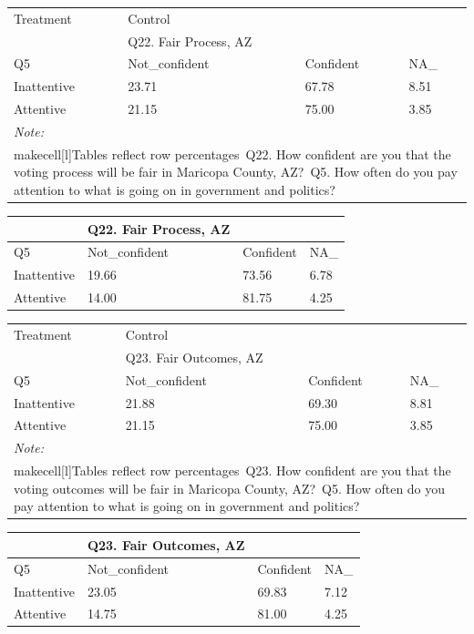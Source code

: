 \documentclass[
  11pt,
  a4paper,
]{article}
\begin{document}
\begin{table}
\centering
\centering
\begin{tabular}[t]{l|l|l|l}
\hline
\multicolumn{1}{l|}{Treatment} & \multicolumn{1}{l}{Control} \\
\cline{1-1} \cline{2-2}
 & Q22. Fair Process, AZ &  & \\
\hline
Q5 & Not\_confident & Confident & NA\_\\
\hline
Inattentive & 23.71 & 67.78 & 8.51\\
\hline
Attentive & 21.15 & 75.00 & 3.85\\
\hline
\multicolumn{4}{l}{\rule{0pt}{1em}\textit{Note: }}\\
\multicolumn{4}{l}{\rule{0pt}{1em}makecell[l]{Tables reflect row percentages\ Q22. How confident are you that the voting process will be fair in Maricopa County, AZ?\ Q5. How often do you pay attention to what is going on in government and politics?}}\\
\end{tabular}
\centering
\begin{tabular}[t]{l|l|l|l}
\hline
 & Q22. Fair Process, AZ &  & \\
\hline
Q5 & Not\_confident & Confident & NA\_\\
\hline
Inattentive & 19.66 & 73.56 & 6.78\\
\hline
Attentive & 14.00 & 81.75 & 4.25\\
\hline
\end{tabular}
\end{table}

\begin{table}
\centering
\centering
\begin{tabular}[t]{l|l|l|l}
\hline
\multicolumn{1}{l|}{Treatment} & \multicolumn{1}{l}{Control} \\
\cline{1-1} \cline{2-2}
 & Q23. Fair Outcomes, AZ &  & \\
\hline
Q5 & Not\_confident & Confident & NA\_\\
\hline
Inattentive & 21.88 & 69.30 & 8.81\\
\hline
Attentive & 21.15 & 75.00 & 3.85\\
\hline
\multicolumn{4}{l}{\rule{0pt}{1em}\textit{Note: }}\\
\multicolumn{4}{l}{\rule{0pt}{1em}makecell[l]{Tables reflect row percentages\ Q23. How confident are you that the voting outcomes will be fair in Maricopa County, AZ?\ Q5. How often do you pay attention to what is going on in government and politics?}}\\
\end{tabular}
\centering
\begin{tabular}[t]{l|l|l|l}
\hline
 & Q23. Fair Outcomes, AZ &  & \\
\hline
Q5 & Not\_confident & Confident & NA\_\\
\hline
Inattentive & 23.05 & 69.83 & 7.12\\
\hline
Attentive & 14.75 & 81.00 & 4.25\\
\hline
\end{tabular}
\end{table}
\end{document}
